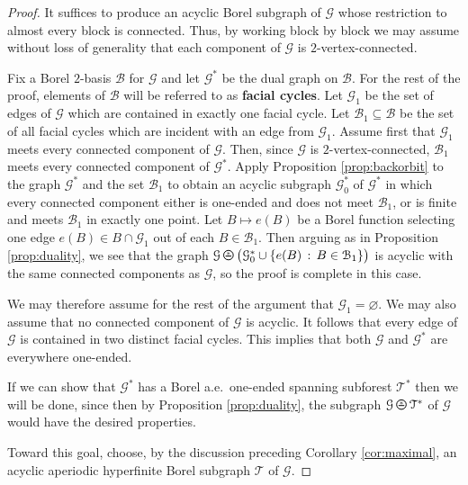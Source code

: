 \documentclass[11pt]{amsart}
\theoremstyle{definition}
\theoremstyle{plain}
\newcommand{\<}{\langle}
\renewcommand{\>}{\rangle}
\newcommand{\mc}[1]{\mathcal{#1}}
\renewcommand{\emptyset}{\varnothing}
\newcommand{\Ggraph}{\mathcal{G}}
\newcommand{\Tgraph}{\mathcal{T}}
\newcommand{\define}[1]{\textbf{#1}}
\newcommand{\oPerpStar}{\begin{tikzpicture}[scale=0.134]
\draw[thick,line width=0.7pt](-0.6,-0.2)--(0.6,-0.2) ;
    \draw (0,0.1) node[scale=0.6] {\rm{*}};
  \draw[line width=0.7pt] (0,0) circle [radius=1];
\end{tikzpicture}}
\newcommand{\oPerpstar}{\mathbin{\raisebox{-1pt}{\oPerpStar}}}
\begin{document}
\begin{proof}
It suffices to produce an acyclic Borel subgraph of $\Ggraph$ whose restriction to almost every block is connected. Thus, by working block by block we may assume without loss of generality that each component of $\Ggraph$ is $2$-vertex-connected.

Fix a Borel $2$-basis $\mc{B}$ for ${\Ggraph}$ and let ${\Ggraph}^*$ be the
dual graph on $\mc{B}$. For the rest of the proof, elements of $\mc{B}$
will be referred to as \define{facial cycles}.
Let ${\Ggraph}_1$ be the set of edges of ${\Ggraph}$ which are
contained in exactly one facial cycle. Let $\mc{B}_1\subseteq \mc{B}$ be
the set of all facial cycles which are incident with an edge from
${\Ggraph}_1$. Assume first that $\Ggraph _1$ meets every connected component of ${\Ggraph}$. Then, since $\Ggraph$ is $2$-vertex-connected, $\mc{B}_1$ meets every connected component
of ${\Ggraph}^*$. Apply Proposition \ref{prop:backorbit} to the graph
${\Ggraph}^*$ and the set $\mc{B}_1$ to obtain an acyclic subgraph
${\Ggraph}_0^*$ of ${\Ggraph}^*$ in which every connected component either
is one-ended and does not meet $\mc{B}_1$, or is finite and meets
$\mc{B}_1$ in exactly one point. Let $B\mapsto e(B)$ be a Borel function
selecting one edge $e(B)\in B\cap {\Ggraph}_1$ out of each $B\in \mc{B}_1$.
Then arguing as in Proposition \ref{prop:duality}, we see that the graph
${\Ggraph} \oPerpstar  \big( {\Ggraph}_0^* \cup \{ e(B) \, : \, B\in \mc{B}_1 \} \big)$ is acyclic
with the same connected components as $\Ggraph$, so the proof is complete in this case.

We may therefore assume for the rest of the argument that
${\Ggraph}_1=\emptyset$. We may also assume that no connected component of
${\Ggraph}$ is acyclic. It follows that every edge of ${\Ggraph}$ is
contained in two distinct facial cycles. This implies that both ${\Ggraph}$
and ${\Ggraph}^*$ are everywhere one-ended.

If we can show that $\Ggraph ^*$ has a Borel a.e.\ one-ended spanning subforest $\Tgraph ^*$ then we will be done, since then by Proposition \ref{prop:duality}, the subgraph ${\Ggraph} \oPerpstar  \Tgraph ^*$ of $\Ggraph$ would have the desired properties.

Toward this goal, choose, by the discussion preceding Corollary \ref{cor:maximal}, an acyclic aperiodic hyperfinite Borel subgraph ${\Tgraph}$ of ${\Ggraph}$.


\end{proof}
\end{document}
